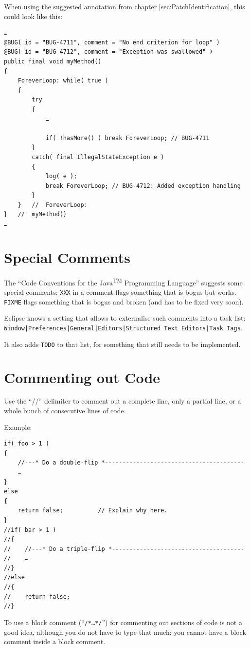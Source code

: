 \documentclass[11pt,a4paper, titlepage, parskip=half, headsepline, footsepline, cleardoublepage=current, headheight=1cm]{scrbook}
\newcommand*{\tqref}[1]{\hyperref[{#1}]{\ref*{#1}}}
\begin{document}
When using the suggested annotation from chapter \tqref{sec:PatchIdentification}, this could look like this:
\begin{lstlisting}
…
@BUG( id = "BUG-4711", comment = "No end criterion for loop" )
@BUG( id = "BUG-4712", comment = "Exception was swallowed" )
public final void myMethod()
{
    ForeverLoop: while( true )
    {
        try
        {
            …
            
            if( !hasMore() ) break ForeverLoop; // BUG-4711
        }
        catch( final IllegalStateException e )
        {
            log( e );
            break ForeverLoop; // BUG-4712: Added exception handling
        }
    }   //  ForeverLoop:
}   //  myMethod()
…
\end{lstlisting}

\section{Special Comments}
The “Code Conventions for the Java\textsuperscript{TM} Programming Language”\autocite{SUN_CODE_CONVENTIONS:SpecialComments} suggests some special comments: \verb#XXX# in a comment flags something that is bogus but works. \verb#FIXME# flags something that is bogus and broken (and has to be fixed very soon).

Eclipse knows a setting that allows to externalise such comments into a task list:\\ \verb#Window|Preferences|General|Editors|Structured Text Editors|Task Tags#.

It also adds \verb#TODO# to that list, for something that still needs to be implemented.

\section{Commenting out Code}
Use the “//” delimiter to comment out a complete line, only a partial line, or a whole bunch of consecutive lines of code.

Example:
\begin{lstlisting}
if( foo > 1 )
{
    //---* Do a double-flip *----------------------------------------
    …
}
else
{
    return false;          // Explain why here.
}
//if( bar > 1 )
//{
//    //---* Do a triple-flip *--------------------------------------
//    …
//}
//else
//{
//    return false;
//}
\end{lstlisting}

To use a block comment (“\verb#/*…*/#”) for commenting out sections of code is not a good idea, although you do not have to type that much: you cannot have a block comment inside a block comment.
\end{document}
